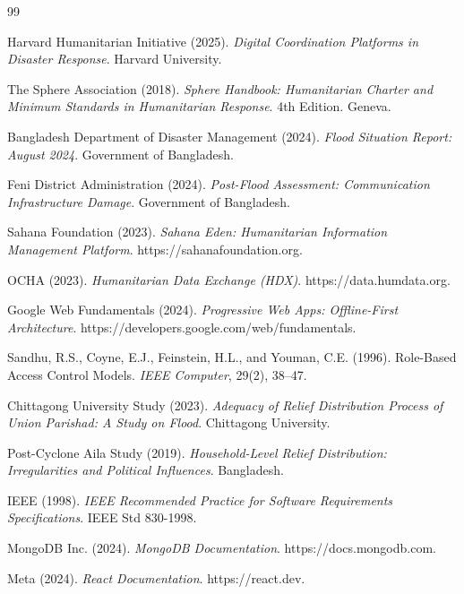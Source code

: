 
\begin{thebibliography}{99}

Harvard Humanitarian Initiative (2025). \textit{Digital Coordination Platforms in Disaster Response}. Harvard University.

The Sphere Association (2018). \textit{Sphere Handbook: Humanitarian Charter and Minimum Standards in Humanitarian Response}. 4th Edition. Geneva.

Bangladesh Department of Disaster Management (2024). \textit{Flood Situation Report: August 2024}. Government of Bangladesh.

Feni District Administration (2024). \textit{Post-Flood Assessment: Communication Infrastructure Damage}. Government of Bangladesh.

Sahana Foundation (2023). \textit{Sahana Eden: Humanitarian Information Management Platform}. https://sahanafoundation.org.

OCHA (2023). \textit{Humanitarian Data Exchange (HDX)}. https://data.humdata.org.

Google Web Fundamentals (2024). \textit{Progressive Web Apps: Offline-First Architecture}. https://developers.google.com/web/fundamentals.

Sandhu, R.S., Coyne, E.J., Feinstein, H.L., and Youman, C.E. (1996). Role-Based Access Control Models. \textit{IEEE Computer}, 29(2), 38--47.

Chittagong University Study (2023). \textit{Adequacy of Relief Distribution Process of Union Parishad: A Study on Flood}. Chittagong University.

Post-Cyclone Aila Study (2019). \textit{Household-Level Relief Distribution: Irregularities and Political Influences}. Bangladesh.

IEEE (1998). \textit{IEEE Recommended Practice for Software Requirements Specifications}. IEEE Std 830-1998.

MongoDB Inc. (2024). \textit{MongoDB Documentation}. https://docs.mongodb.com.

Meta (2024). \textit{React Documentation}. https://react.dev.


\end{thebibliography}
